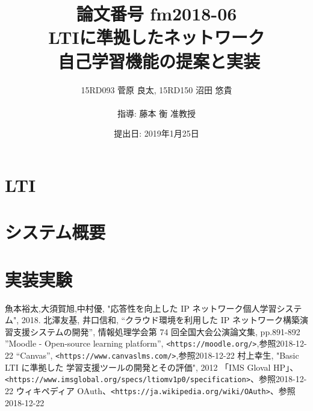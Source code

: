 \documentclass[11pt, a4paper]{jarticle}
\title{\LARGE 論文番号 fm2018-06\\ \Huge LTIに準拠したネットワーク\\自己学習機能の提案と実装}
\author{15RD093 菅原 良太, 15RD150 沼田 悠貴\\ \\指導: 藤本 衡 准教授}
\date{提出日: 2019年1月25日}
\begin{document}
\pagestyle{normal}
\maketitle
\clearpage


\fontsize{11pt}{28pt}\selectfont


\clearpage

\tableofcontents
\clearpage


\clearpage

%

\section{LTI}

%
%
%

\clearpage

\section{システム概要}




\clearpage

\section{実装実験}

\clearpage


\clearpage



\clearpages


\begin{thebibliography}{9999}
   魚本裕太,大須賀旭,中村優, "応答性を向上した
IP ネットワーク個人学習システム", 2018.
   北澤友基, 井口信和, “クラウド環境を利用した IP ネットワーク構築演習支援システムの開発”, 情報処理学会第 74 回全国大会公演論文集, pp.891-892
   ”Moodle - Open-source learning platform”, \texttt{<https://moodle.org/>},参照2018-12-22
   “Canvas”, \texttt{<https://www.canvaslms.com/>},参照2018-12-22
   村上幸生, "Basic LTI に準拠した 学習支援ツールの開発とその評価", 2012
   「IMS Gloval HP」、\texttt{<https://www.imsglobal.org/specs/ltiomv1p0/specification>}、参照2018-12-22
  ウィキペディア OAuth、\texttt{<https://ja.wikipedia.org/wiki/OAuth>}、参照2018-12-22
\end{thebibliography}
\end{document}
